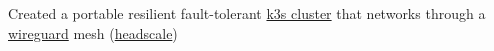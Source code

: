 {Created a portable resilient fault-tolerant \href{https://k3s.io/}{k3s cluster} that networks through a \href{https://www.wireguard.com/}{wireguard} mesh (\href{https://github.com/juanfont/headscale}{headscale})}
